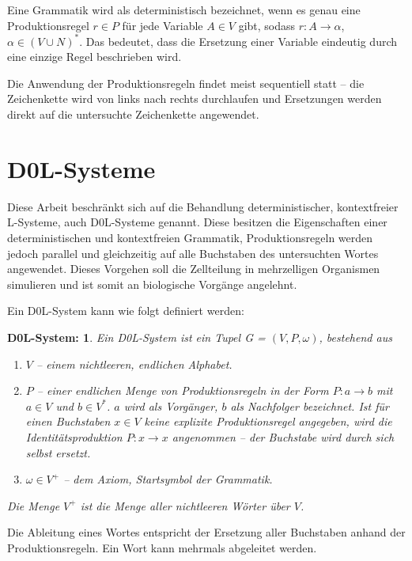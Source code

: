 Eine Grammatik wird als deterministisch bezeichnet, wenn es genau eine Produktionsregel $r \in P$ für jede Variable $A \in V$ gibt, sodass $r: A \rightarrow \alpha$, $\alpha \in (V \cup N )^*$. Das bedeutet, dass die Ersetzung einer Variable eindeutig durch eine einzige Regel beschrieben wird. \cite[S.75]{PCGiG:16}

Die Anwendung der Produktionsregeln findet meist sequentiell statt -- die Zeichenkette wird von links nach rechts durchlaufen und Ersetzungen werden direkt auf die untersuchte Zeichenkette angewendet. \cite[S.75]{PCGiG:16}

\section{D0L-Systeme}

Diese Arbeit beschränkt sich auf die Behandlung deterministischer, kontextfreier L-Systeme, auch D0L-Systeme genannt. Diese besitzen die Eigenschaften einer deterministischen und kontextfreien Grammatik, Produktionsregeln werden jedoch parallel und gleichzeitig auf alle Buchstaben des untersuchten Wortes angewendet. Dieses Vorgehen soll die Zellteilung in mehrzelligen Organismen simulieren und ist somit an biologische Vorgänge angelehnt. \cite[S. 3]{ABOP:04} 

Ein D0L-System kann wie folgt definiert werden:
\newtheorem{defD0LSystem}{D0L-System:}[chapter]
\begin{defD0LSystem}
	Ein D0L-System ist ein Tupel G = $(V, P, \omega)$, bestehend aus
	\begin{enumerate}
		\item $V$ -- einem nichtleeren, endlichen Alphabet.
		\item $P$ -- einer endlichen Menge von Produktionsregeln in der Form $P: a \rightarrow b$ mit $a \in V$ und $b \in V^*$. $a$ wird als Vorgänger, $b$ als Nachfolger bezeichnet. Ist für einen Buchstaben $x \in V$ keine explizite Produktionsregel angegeben, wird die Identitätsproduktion $P: x \rightarrow x$ angenommen -- der Buchstabe wird durch sich selbst ersetzt.
		\item $\omega \in V^+$ -- dem Axiom, Startsymbol der Grammatik.
	\end{enumerate}
Die Menge $V^+$ ist die Menge aller nichtleeren Wörter über $V$. \cite[S.4]{ABOP:04} 
\end{defD0LSystem}

Die Ableitung eines Wortes entspricht der Ersetzung aller Buchstaben anhand der Produktionsregeln. Ein Wort kann mehrmals abgeleitet werden. 


